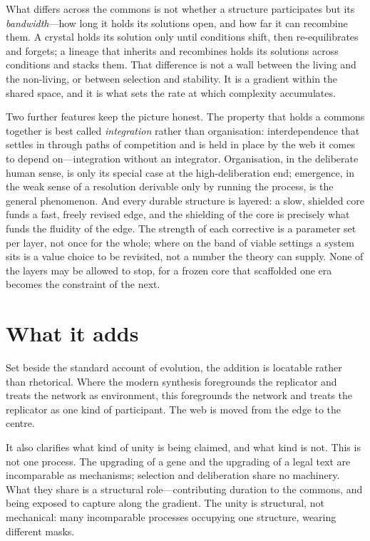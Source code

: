 \documentclass[11pt]{article}
\begin{document}
What differs across the commons is not whether a structure participates but its \emph{bandwidth}---how long it holds its solutions open, and how far it can recombine them. A crystal holds its solution only until conditions shift, then re-equilibrates and forgets; a lineage that inherits and recombines holds its solutions across conditions and stacks them. That difference is not a wall between the living and the non-living, or between selection and stability. It is a gradient within the shared space, and it is what sets the rate at which complexity accumulates.

Two further features keep the picture honest. The property that holds a commons together is best called \emph{integration} rather than organisation: interdependence that settles in through paths of competition and is held in place by the web it comes to depend on---integration without an integrator. Organisation, in the deliberate human sense, is only its special case at the high-deliberation end; emergence, in the weak sense of a resolution derivable only by running the process, is the general phenomenon. And every durable structure is layered: a slow, shielded core funds a fast, freely revised edge, and the shielding of the core is precisely what funds the fluidity of the edge. The strength of each corrective is a parameter set per layer, not once for the whole; where on the band of viable settings a system sits is a value choice to be revisited, not a number the theory can supply. None of the layers may be allowed to stop, for a frozen core that scaffolded one era becomes the constraint of the next.

\section*{What it adds}

Set beside the standard account of evolution, the addition is locatable rather than rhetorical. Where the modern synthesis foregrounds the replicator and treats the network as environment, this foregrounds the network and treats the replicator as one kind of participant. The web is moved from the edge to the centre.

It also clarifies what kind of unity is being claimed, and what kind is not. This is not one process. The upgrading of a gene and the upgrading of a legal text are incomparable as mechanisms; selection and deliberation share no machinery. What they share is a structural role---contributing duration to the commons, and being exposed to capture along the gradient. The unity is structural, not mechanical: many incomparable processes occupying one structure, wearing different masks.
\end{document}
